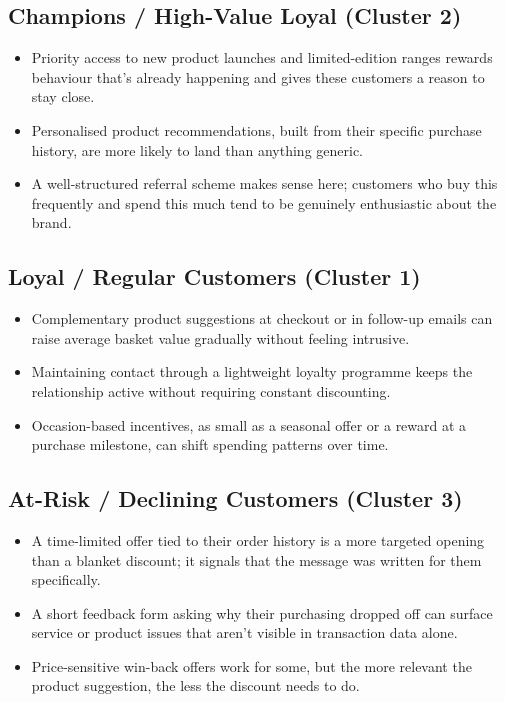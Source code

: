 \documentclass[12pt, a4paper]{article}
\begin{document}
\subsection{Champions / High-Value Loyal (Cluster 2)}
\begin{itemize}[nosep]
    \item Priority access to new product launches and limited-edition ranges rewards behaviour that's already happening and gives these customers a reason to stay close.
    \item Personalised product recommendations, built from their specific purchase history, are more likely to land than anything generic.
    \item A well-structured referral scheme makes sense here; customers who buy this frequently and spend this much tend to be genuinely enthusiastic about the brand.
\end{itemize}

\subsection{Loyal / Regular Customers (Cluster 1)}
\begin{itemize}[nosep]
    \item Complementary product suggestions at checkout or in follow-up emails can raise average basket value gradually without feeling intrusive.
    \item Maintaining contact through a lightweight loyalty programme keeps the relationship active without requiring constant discounting.
    \item Occasion-based incentives, as small as a seasonal offer or a reward at a purchase milestone, can shift spending patterns over time.
\end{itemize}

\subsection{At-Risk / Declining Customers (Cluster 3)}
\begin{itemize}[nosep]
    \item A time-limited offer tied to their order history is a more targeted opening than a blanket discount; it signals that the message was written for them specifically.
    \item A short feedback form asking why their purchasing dropped off can surface service or product issues that aren't visible in transaction data alone.
    \item Price-sensitive win-back offers work for some, but the more relevant the product suggestion, the less the discount needs to do.
\end{itemize}
\end{document}
